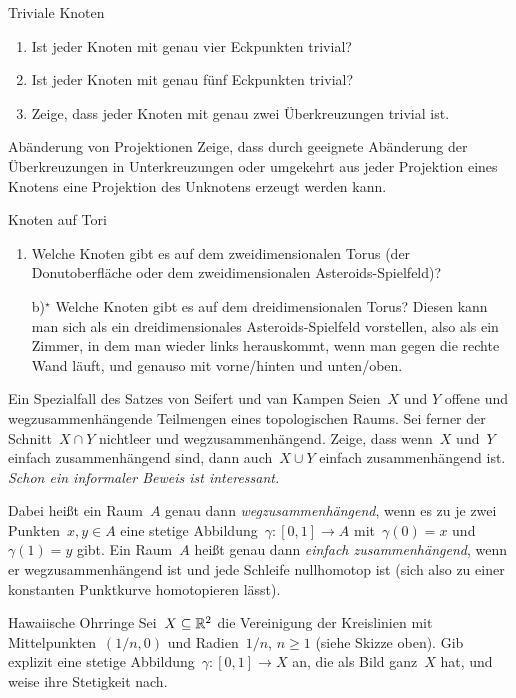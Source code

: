\documentclass{pizzablatt}
\begin{document}
\begin{aufgabe}{Triviale Knoten}
\begin{enumerate}
\item Ist jeder Knoten mit genau vier Eckpunkten trivial?
\item Ist jeder Knoten mit genau fünf Eckpunkten trivial?
\item Zeige, dass jeder Knoten mit genau zwei Überkreuzungen trivial ist.
\end{enumerate}
\end{aufgabe}

\begin{aufgabe}{Abänderung von Projektionen}
Zeige, dass durch geeignete Abänderung der Überkreuzungen in Unterkreuzungen
oder umgekehrt aus jeder Projektion eines Knotens eine Projektion des Unknotens
erzeugt werden kann.
\end{aufgabe}

\begin{aufgabe}{Knoten auf Tori}
\begin{enumerate}
\item Welche Knoten gibt es auf dem zweidimensionalen Torus (der
Donutoberfläche oder dem zweidimensionalen Asteroids-Spielfeld)?
\item[b)$^\star$] Welche Knoten gibt es auf dem dreidimensionalen Torus? Diesen kann man
sich als ein dreidimensionales Asteroids-Spielfeld vorstellen, also als ein
Zimmer, in dem man wieder links herauskommt, wenn man gegen die rechte Wand
läuft, und genauso mit vorne/hinten und unten/oben.
\end{enumerate}
\end{aufgabe}

\begin{aufgabe}{Ein Spezialfall des Satzes von Seifert und van Kampen}
Seien~$X$ und $Y$ offene und wegzusammenhängende Teilmengen
eines topologischen Raums. Sei ferner der Schnitt~$X \cap Y$ nichtleer und
wegzusammenhängend. Zeige, dass wenn~$X$ und~$Y$ einfach zusammenhängend
sind, dann auch~$X \cup Y$ einfach zusammenhängend ist. \emph{Schon ein
informaler Beweis ist interessant.}

Dabei heißt ein Raum~$A$ genau dann \emph{wegzusammenhängend}, wenn es zu je zwei
Punkten~$x,y \in A$ eine stetige Abbildung~$\gamma : [0,1] \to A$
mit~$\gamma(0) = x$ und~$\gamma(1) = y$ gibt. Ein Raum~$A$ heißt genau dann
\emph{einfach zusammenhängend}, wenn er wegzusammenhängend ist und jede
Schleife nullhomotop ist (sich also zu einer konstanten Punktkurve homotopieren
lässt).
\end{aufgabe}

\begin{aufgabe}{Hawaiische Ohrringe}
Sei~$X \subseteq \mathbb{R}^2$ die Vereinigung der Kreislinien mit Mittelpunkten~$(1/n,
0)$ und Radien~$1/n$, $n \geq 1$ (siehe Skizze oben). Gib explizit eine stetige
Abbildung~$\gamma : [0,1] \to X$ an, die als Bild ganz~$X$ hat, und weise ihre
Stetigkeit nach.
\end{aufgabe}
\end{document}
